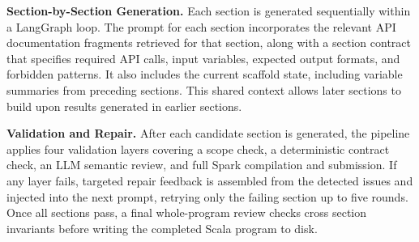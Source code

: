 \textbf{Section-by-Section Generation.}
Each section is generated sequentially within a LangGraph loop. The prompt for each section incorporates the relevant API documentation fragments retrieved for that section, along with a section contract that specifies required API calls, input variables, expected output formats, and forbidden patterns. It also includes the current scaffold state, including variable summaries from preceding sections. This shared context allows later sections to build upon results generated in earlier sections.

\textbf{Validation and Repair.}
After each candidate section is generated, the pipeline applies four validation layers covering a scope check, a deterministic contract check, an LLM semantic review, and full Spark compilation and submission. If any layer fails, targeted repair feedback is assembled from the detected issues and injected into the next prompt, retrying only the failing section up to five rounds. Once all sections pass, a final whole-program review checks cross section invariants before writing the completed Scala program to disk.
